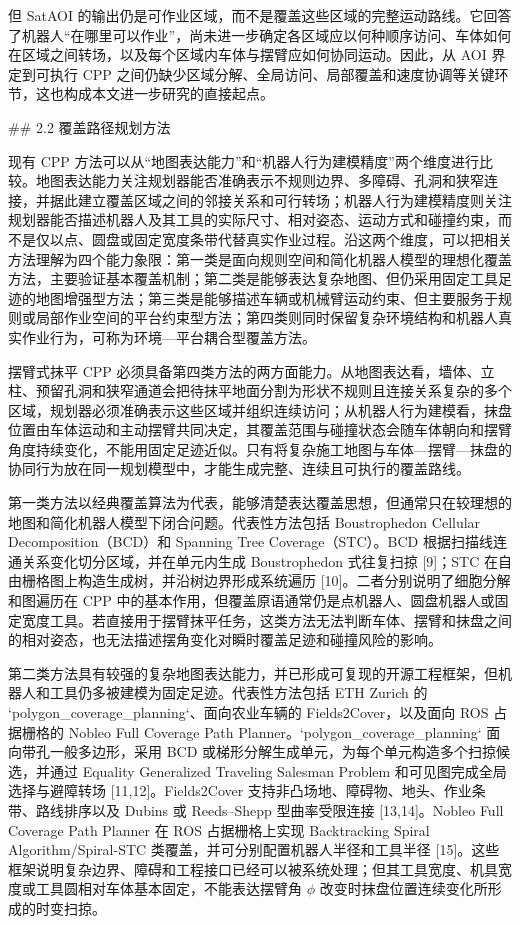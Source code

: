 但 SatAOI 的输出仍是可作业区域，而不是覆盖这些区域的完整运动路线。它回答了机器人“在哪里可以作业”，尚未进一步确定各区域应以何种顺序访问、车体如何在区域之间转场，以及每个区域内车体与摆臂应如何协同运动。因此，从 AOI 界定到可执行 CPP 之间仍缺少区域分解、全局访问、局部覆盖和速度协调等关键环节，这也构成本文进一步研究的直接起点。

  

## 2.2 覆盖路径规划方法

  

现有 CPP 方法可以从“地图表达能力”和“机器人行为建模精度”两个维度进行比较。地图表达能力关注规划器能否准确表示不规则边界、多障碍、孔洞和狭窄连接，并据此建立覆盖区域之间的邻接关系和可行转场；机器人行为建模精度则关注规划器能否描述机器人及其工具的实际尺寸、相对姿态、运动方式和碰撞约束，而不是仅以点、圆盘或固定宽度条带代替真实作业过程。沿这两个维度，可以把相关方法理解为四个能力象限：第一类是面向规则空间和简化机器人模型的理想化覆盖方法，主要验证基本覆盖机制；第二类是能够表达复杂地图、但仍采用固定工具足迹的地图增强型方法；第三类是能够描述车辆或机械臂运动约束、但主要服务于规则或局部作业空间的平台约束型方法；第四类则同时保留复杂环境结构和机器人真实作业行为，可称为环境—平台耦合型覆盖方法。

摆臂式抹平 CPP 必须具备第四类方法的两方面能力。从地图表达看，墙体、立柱、预留孔洞和狭窄通道会把待抹平地面分割为形状不规则且连接关系复杂的多个区域，规划器必须准确表示这些区域并组织连续访问；从机器人行为建模看，抹盘位置由车体运动和主动摆臂共同决定，其覆盖范围与碰撞状态会随车体朝向和摆臂角度持续变化，不能用固定足迹近似。只有将复杂施工地图与车体—摆臂—抹盘的协同行为放在同一规划模型中，才能生成完整、连续且可执行的覆盖路线。

  

第一类方法以经典覆盖算法为代表，能够清楚表达覆盖思想，但通常只在较理想的地图和简化机器人模型下闭合问题。代表性方法包括 Boustrophedon Cellular Decomposition（BCD）和 Spanning Tree Coverage（STC）。BCD 根据扫描线连通关系变化切分区域，并在单元内生成 Boustrophedon 式往复扫掠 [9]；STC 在自由栅格图上构造生成树，并沿树边界形成系统遍历 [10]。二者分别说明了细胞分解和图遍历在 CPP 中的基本作用，但覆盖原语通常仍是点机器人、圆盘机器人或固定宽度工具。若直接用于摆臂抹平任务，这类方法无法判断车体、摆臂和抹盘之间的相对姿态，也无法描述摆角变化对瞬时覆盖足迹和碰撞风险的影响。

  

第二类方法具有较强的复杂地图表达能力，并已形成可复现的开源工程框架，但机器人和工具仍多被建模为固定足迹。代表性方法包括 ETH Zurich 的 `polygon_coverage_planning`、面向农业车辆的 Fields2Cover，以及面向 ROS 占据栅格的 Nobleo Full Coverage Path Planner。`polygon_coverage_planning` 面向带孔一般多边形，采用 BCD 或梯形分解生成单元，为每个单元构造多个扫掠候选，并通过 Equality Generalized Traveling Salesman Problem 和可见图完成全局选择与避障转场 [11,12]。Fields2Cover 支持非凸场地、障碍物、地头、作业条带、路线排序以及 Dubins 或 Reeds–Shepp 型曲率受限连接 [13,14]。Nobleo Full Coverage Path Planner 在 ROS 占据栅格上实现 Backtracking Spiral Algorithm/Spiral-STC 类覆盖，并可分别配置机器人半径和工具半径 [15]。这些框架说明复杂边界、障碍和工程接口已经可以被系统处理；但其工具宽度、机具宽度或工具圆相对车体基本固定，不能表达摆臂角 $\phi$ 改变时抹盘位置连续变化所形成的时变扫掠。

